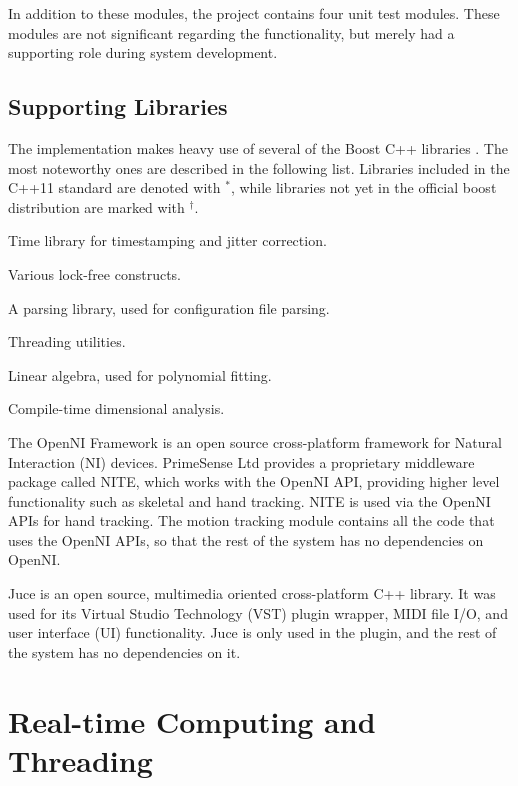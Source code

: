 In addition to these
 modules,
the project contains four unit test modules.
These modules are not significant regarding the functionality,
but merely had a supporting role during system development.

\subsection{Supporting Libraries}
\label{sec:supporting_libraries}

The implementation makes heavy use of several of the Boost C++ libraries \cite{boost}.
The most noteworthy ones are described in the following list.
Libraries included in the C++11 standard \cite{cpp11}
are denoted with $^*$,
while libraries not yet in the official boost distribution
are marked with $^\dagger$.
\begin{description}[leftmargin=14ex]
\item[Chrono$^*$] Time library for timestamping and jitter correction.
\item[Lockfree$^\dagger$] Various lock-free constructs.
\item[Spirit] A parsing library, used for configuration file parsing.
\item[Thread$^*$] Threading utilities.
\item[uBLAS] Linear algebra, used for polynomial fitting.
\item[Units] Compile-time dimensional analysis.
\end{description}

The OpenNI Framework \cite{openni} is an open source cross-platform
framework for Natural Interaction (NI) devices.
PrimeSense Ltd \cite{primesense} provides a proprietary
middleware package called NITE,
which works with the OpenNI API,
providing higher level functionality such as skeletal and hand tracking.
NITE is used via the OpenNI APIs for hand tracking.
The motion tracking module contains
all the code that uses the OpenNI APIs,
so that the rest of the system has no dependencies on OpenNI.

Juce \cite{juce} is an open source,
multimedia oriented cross-platform C++ library.
It was used for its
Virtual Studio Technology (VST) plugin wrapper,
MIDI file I/O,
and user interface (UI) functionality.
Juce is only used in the plugin,
and the rest of the system has no dependencies on it.

\section{Real-time Computing and Threading}
\label{sec:real_time_and_threading}

